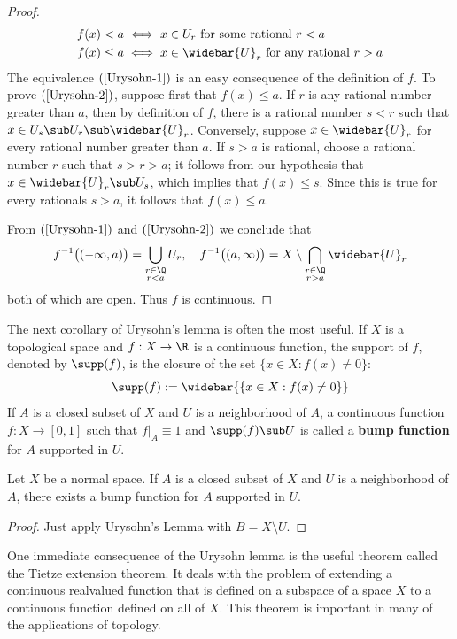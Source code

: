 \begin{proof}
\begin{align}
&f(x)<a \iff x\in U_r\text{ for some rational }r<a\label{Urysohn-1}\\
&f(x)\leq a \iff x\in \widebar{U}_r\text{ for any rational }r>a\label{Urysohn-2}
\end{align}
The equivalence $(\ref{Urysohn-1})$ is an easy consequence of the definition of $f$. To prove $(\ref{Urysohn-2})$, suppose first that $f(x)\leq a$. If $r$ is any rational number greater than $a$, then by
definition of $f$, there is a rational number $s<r$ such that $x\in U_s\sub U_r\sub\widebar{U}_r$. Conversely, suppose $x\in\widebar{U}_r$ for every rational number greater than $a$. If $s>a$ is rational, choose a rational number $r$ such that $s>r>a$; it follows from our hypothesis that
$x\in\widebar{U}_r\sub U_s$, which implies that $f(x)\leq s$. Since this is true for every rationals $s>a$, it follows that $f(x)\leq a$.\par
From $(\ref{Urysohn-1})$ and $(\ref{Urysohn-2})$ we conclude that
\[f^{-1}\big((-\infty,a)\big)=\bigcup_{\substack{r\in\Q\\r<a}}U_r,\quad f^{-1}\big((a,\infty)\big)=X\setminus\bigcap_{\substack{r\in\Q\\r>a}}\widebar{U}_r\]
both of which are open. Thus $f$ is continuous.
\end{proof}
The next corollary of Urysohn's lemma is often the most useful. If $X$ is a topological space and $f:X\to \R$ is a continuous function, the support of $f$, denoted by $\supp(f)$, is the closure of the set $\{x\in X:f(x)\neq 0\}$:
\[\supp(f):=\widebar{\{x\in X:f(x)\neq 0\}}\]
If $A$ is a closed subset of $X$ and $U$ is a neighborhood of $A$, a continuous function $f:X\to[0,1]$ such that $f|_A\equiv1$ and $\supp(f)\sub U$ is called a \textbf{bump function} for $A$ supported in $U$.
\begin{theorem}
Let $X$ be a normal space. If $A$ is a closed subset of $X$ and $U$ is a neighborhood of $A$, there exists a bump function for $A$ supported in $U$.
\end{theorem}
\begin{proof}
Just apply Urysohn's Lemma with $B=X\setminus U$.
\end{proof}
One immediate consequence of the Urysohn lemma is the useful theorem called the Tietze extension theorem. It deals with the problem of extending a continuous realvalued function that is defined on a subspace of a space $X$ to a continuous function defined on all of $X$. This theorem is important in many of the applications of topology.

